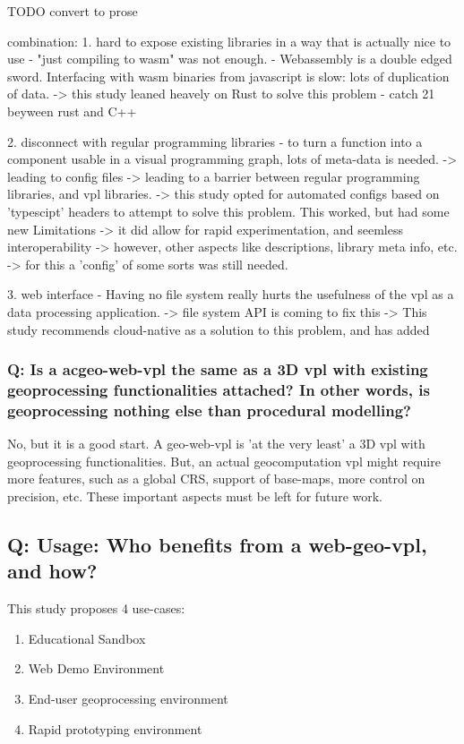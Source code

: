 \begin{note}

  TODO convert to prose

  combination: 
  1. hard to expose existing libraries in a way that is actually nice to use
  - "just compiling to wasm" was not enough.
  - Webassembly is a double edged sword. Interfacing with wasm binaries from javascript is slow: lots of duplication of data. 
  -> this study leaned heavely on Rust to solve this problem
  - catch 21 beyween rust and C++
  
  2. disconnect with regular programming libraries
  - to turn a function into a component usable in a visual programming graph, lots of meta-data is needed. 
    -> leading to config files 
    -> leading to a barrier between regular programming libraries, and vpl libraries. 
    -> this study opted for automated configs based on 'typescipt' headers to attempt to solve this problem. This worked, but had some new Limitations
       -> it did allow for rapid experimentation, and seemless interoperability
       -> however, other aspects like descriptions, library meta info, etc. 
       -> for this a 'config' of some sorts was still needed. 
  
  3. web interface
  - Having no file system really hurts the usefulness of the vpl as a data processing application.
  -> file system API is coming to fix this
  -> This study recommends cloud-native as a solution to this problem, and has added 
  
\end{note}

\subsubsection*{Q: Is a ac{geo-web-vpl} the same as a 3D vpl with existing geoprocessing functionalities attached? In other words, is geoprocessing nothing else than procedural modelling?}

No, but it is a good start. 
A geo-web-vpl is 'at the very least' a 3D vpl with geoprocessing functionalities. 
But, an actual geocomputation vpl might require more features, such as a global CRS, support of base-maps, more control on precision, etc. 
These important aspects must be left for future work.

\subsection{Q: Usage: Who benefits from a web-geo-vpl, and how? }
This study proposes 4 use-cases:
\begin{enumerate}[-]
  \item Educational Sandbox
  \item Web Demo Environment
  \item End-user geoprocessing environment 
  \item Rapid prototyping environment
\end{enumerate}

